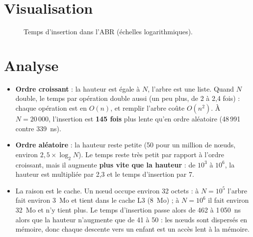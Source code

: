 \documentclass[12pt,a4paper]{report}
\begin{document}
\section{Visualisation}
\begin{figure}[H]
\centering
{}
\caption{Temps d'insertion dans l'ABR (échelles logarithmiques).}
\end{figure}

\section{Analyse}
\begin{itemize}
  \item \textbf{Ordre croissant} : la hauteur est égale à $N$, l'arbre est une liste. Quand $N$ double, le temps par opération double aussi (un peu plus, de 2 à 2,4 fois) : chaque opération est en $O(n)$, et remplir l'arbre coûte $O(n^2)$. À $N=20\,000$, l'insertion est \textbf{145 fois} plus lente qu'en ordre aléatoire (48\,991 contre 339~ns).
  \item \textbf{Ordre aléatoire} : la hauteur reste petite (50 pour un million de nœuds, environ $2{,}5\times\log_2 N$). Le temps reste très petit par rapport à l'ordre croissant, mais il augmente \textbf{plus vite que la hauteur} : de $10^3$ à $10^6$, la hauteur est multipliée par 2,3 et le temps d'insertion par 7.
  \item La raison est le cache. Un nœud occupe environ 32 octets : à $N=10^5$ l'arbre fait environ 3~Mo et tient dans le cache L3 (8~Mo) ; à $N=10^6$ il fait environ 32~Mo et n'y tient plus. Le temps d'insertion passe alors de 462 à 1\,050~ns alors que la hauteur n'augmente que de 41 à 50 : les nœuds sont dispersés en mémoire, donc chaque descente vers un enfant est un accès lent à la mémoire.
\end{itemize}
\end{document}
